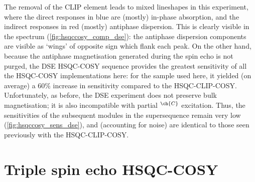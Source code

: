 \documentclass[a4paper,12pt]{article}
\newcommand{\magn}[1]{\ch{^1H}$^{\ch{#1}}$}
\newcommand{\magnnot}[1]{\ch{^1H}$^{!\ch{#1}}$}
\begin{document}
\begin{refsection}
The removal of the CLIP element leads to mixed lineshapes in this experiment, where the direct responses in blue are (mostly) in-phase absorption, and the indirect responses in red (mostly) antiphase dispersion.
This is clearly visible in the spectrum (\cref{fig:hsqccosy_comp_dse}): the antiphase dispersion components are visible as `wings' of opposite sign which flank each peak.
On the other hand, because the antiphase magnetisation generated during the spin echo is not purged, the DSE HSQC-COSY sequence provides the greatest sensitivity of all the HSQC-COSY implementations here: for the sample used here, it yielded (on average) a 60\% increase in sensitivity compared to the HSQC-CLIP-COSY.
Unfortunately, as before, the DSE experiment does not preserve bulk magnetisation; it is also incompatible with partial \magn{C} excitation.
Thus, the sensitivities of the subsequent modules in the  supersequence remain very low (\cref{fig:hsqccosy_sens_dse}), and (accounting for noise) are identical to those seen previously with the HSQC-CLIP-COSY.


\section{Triple spin echo HSQC-COSY}


\end{refsection}
\end{document}
